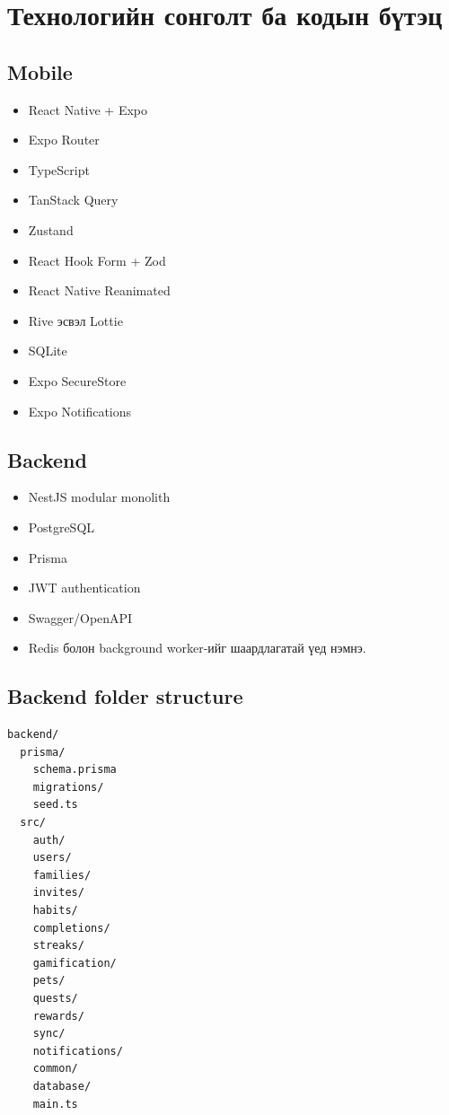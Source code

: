 \documentclass[12pt,a4paper,oneside]{report}
\begin{document}
\chapter{Технологийн сонголт ба кодын бүтэц}

\section{Mobile}
\begin{itemize}
  \item React Native + Expo
  \item Expo Router
  \item TypeScript
  \item TanStack Query
  \item Zustand
  \item React Hook Form + Zod
  \item React Native Reanimated
  \item Rive эсвэл Lottie
  \item SQLite
  \item Expo SecureStore
  \item Expo Notifications
\end{itemize}

\section{Backend}
\begin{itemize}
  \item NestJS modular monolith
  \item PostgreSQL
  \item Prisma
  \item JWT authentication
  \item Swagger/OpenAPI
  \item Redis болон background worker-ийг шаардлагатай үед нэмнэ.
\end{itemize}

\section{Backend folder structure}
\begin{lstlisting}
backend/
  prisma/
    schema.prisma
    migrations/
    seed.ts
  src/
    auth/
    users/
    families/
    invites/
    habits/
    completions/
    streaks/
    gamification/
    pets/
    quests/
    rewards/
    sync/
    notifications/
    common/
    database/
    main.ts
\end{lstlisting}
\end{document}
